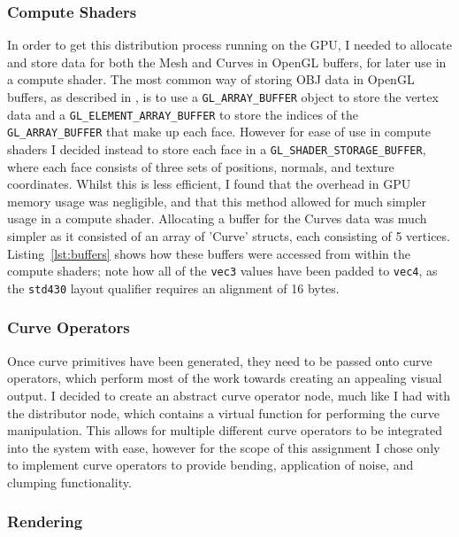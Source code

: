 \documentclass[]{acmsiggraph}
\begin{document}
\subsubsection{Compute Shaders} \label{sec:compute shaders}

In order to get this distribution process running on the GPU, I needed to allocate and store data for both the Mesh and Curves in OpenGL buffers, for later use in a compute shader. The most common way of storing OBJ data in OpenGL buffers, as described in \cite{objLoading}, is to use a \verb|GL_ARRAY_BUFFER| object to store the vertex data and a \verb|GL_ELEMENT_ARRAY_BUFFER| to store the indices of the \verb|GL_ARRAY_BUFFER| that make up each face. However for ease of use in compute shaders I decided instead to store each face in a \verb|GL_SHADER_STORAGE_BUFFER|, where each face consists of three sets of positions, normals, and texture coordinates. Whilst this is less efficient, I found that the overhead in GPU memory usage was negligible, and that this method allowed for much simpler usage in a compute shader. Allocating a buffer for the Curves data was much simpler as it consisted of an array of 'Curve' structs, each consisting of 5 vertices. Listing~\ref{lst:buffers} shows how these buffers were accessed from within the compute shaders; note how all of the \texttt{vec3} values have been padded to \texttt{vec4}, as the \texttt{std430} layout qualifier requires an alignment of 16 bytes.

\subsubsection{Curve Operators} \label{sec:operators}

Once curve primitives have been generated, they need to be passed onto curve operators, which perform most of the work towards creating an appealing visual output. I decided to create an abstract curve operator node, much like I had with the distributor node, which contains a virtual function for performing the curve manipulation. This allows for multiple different curve operators to be integrated into the system with ease, however for the scope of this assignment I chose only to implement curve operators to provide bending, application of noise, and clumping functionality.

\subsubsection{Rendering} \label{sec:rendering}
\end{document}
